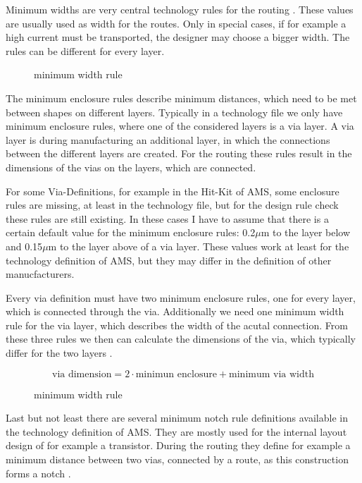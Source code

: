 Minimum widths are very central technology rules for the routing . These values are usually used as width for the routes. Only in special cases, if for example a high current must be transported, the designer may choose a bigger width. The rules can be different for every layer.

\begin{figure}
	\centering
	
	\caption{minimum width rule}
	\label{fig:technology_rule_width}
\end{figure}

The minimum enclosure rules describe minimum distances, which need to be met between shapes on different layers. Typically in a technology file we only have minimum enclosure rules, where one of the considered layers is a via layer. A via layer is during manufacturing an additional layer, in which the connections between the different layers are created. For the routing these rules result in the dimensions of the vias on the layers, which are connected.

For some Via-Definitions, for example in the Hit-Kit of AMS, some enclosure rules are missing, at least in the technology file, but for the design rule check these rules are still existing. In these cases I have to assume that there is a certain default value for the minimum enclosure rules: 0.2$\mu$m to the layer below and 0.15$\mu$m to the layer above of a via layer. These values work at least for the technology definition of AMS, but they may differ in the definition of other manucfacturers.

Every via definition must have two minimum enclosure rules, one for every layer, which is connected through the via. Additionally we need one minimum width rule for the via layer, which describes the width of the acutal connection. From these three rules we then can calculate the dimensions of the via, which typically differ for the two layers .

\[\text{via dimension} = 2 \cdot \text{minimun enclosure} + \text{minimum via width}\]

\begin{figure}
	\centering
	
	\caption{minimum width rule}
	\label{fig:technology_rule_via_dimensions}
\end{figure}

Last but not least there are several minimum notch rule definitions available in the technology definition of AMS. They are mostly used for the internal layout design of for example a transistor. During the routing they define for example a minimum distance between two vias, connected by a route, as this construction forms a notch .

